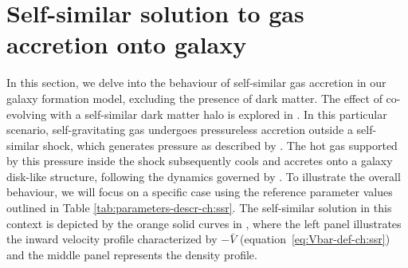 


\section{ Self-similar solution to gas accretion onto galaxy}
\label{sec:results-gaso-ch:ssr}
In this section, we delve into the behaviour of self-similar gas accretion in our galaxy formation model, excluding the presence of dark matter. The effect of co-evolving with a self-similar dark matter halo is explored in . In this particular scenario, self-gravitating gas undergoes pressureless accretion outside a self-similar shock, which generates pressure as described by . The hot gas supported by this pressure inside the shock subsequently cools and accretes onto a galaxy disk-like structure, following the dynamics governed by . To illustrate the overall behaviour, we will focus on a specific case using the reference parameter values outlined in Table \ref{tab:parameters-descr-ch:ssr}. The self-similar solution in this context is depicted by the orange solid curves in , where the left panel illustrates the inward velocity profile characterized by $-\bar{V}$ (equation~\ref{eq:Vbar-def-ch:ssr}) and the middle panel represents the density profile.  



